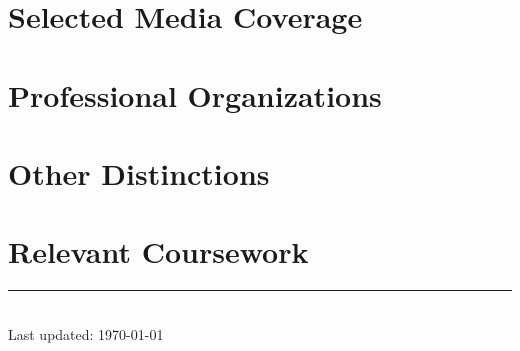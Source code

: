 \documentclass[11pt]{article}
\newcommand{\myinput}[1]{
  
}
\begin{document}
\newpage
{}
\section*{Selected Media Coverage}
\label{media}
\myinput{media}


\section*{Professional Organizations}
\label{organizations}
\myinput{organizations}

\section*{Other Distinctions}
\label{other-distinctions}
\myinput{other_awards}

{}
\section*{Relevant Coursework}
\label{coursework}
\myinput{coursework}

\centering
\rule{0.25\linewidth}{0.4pt}\\
\medskip
Last updated: \today
\end{document}
